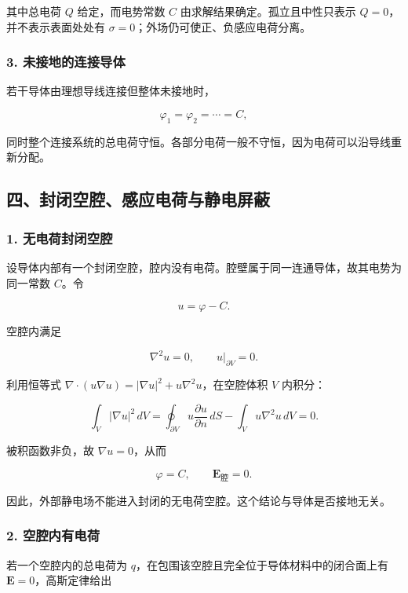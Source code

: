 其中总电荷 \(Q\) 给定，而电势常数 \(C\) 由求解结果确定。孤立且中性只表示
\(Q=0\)，并不表示表面处处有 \(\sigma=0\)；外场仍可使正、负感应电荷分离。

\subsubsection{3.
未接地的连接导体}\label{m2:ux672aux63a5ux5730ux7684ux8fdeux63a5ux5bfcux4f53}

若干导体由理想导线连接但整体未接地时，

\[
\varphi_1=\varphi_2=\cdots=C,
\]

同时整个连接系统的总电荷守恒。各部分电荷一般不守恒，因为电荷可以沿导线重新分配。

\subsection{四、封闭空腔、感应电荷与静电屏蔽}\label{m2:ux56dbux5c01ux95edux7a7aux8154ux611fux5e94ux7535ux8377ux4e0eux9759ux7535ux5c4fux853d}

\subsubsection{1.
无电荷封闭空腔}\label{m2:ux65e0ux7535ux8377ux5c01ux95edux7a7aux8154}

设导体内部有一个封闭空腔，腔内没有电荷。腔壁属于同一连通导体，故其电势为同一常数
\(C\)。令

\[
u=\varphi-C.
\]

空腔内满足

\[
\nabla^2u=0,
\qquad
u|_{\partial V}=0.
\]

利用恒等式
\(\nabla\cdot(u\nabla u)=|\nabla u|^2+u\nabla^2u\)，在空腔体积 \(V\)
内积分：

\[
\int_V|\nabla u|^2\,dV
=\oint_{\partial V}u\frac{\partial u}{\partial n}\,dS
-\int_Vu\nabla^2u\,dV=0.
\]

被积函数非负，故 \(\nabla u=0\)，从而

\[
\boxed{\varphi=C,\qquad \mathbf E_{\text{腔}}=0.}
\]

因此，外部静电场不能进入封闭的无电荷空腔。这个结论与导体是否接地无关。

\subsubsection{2.
空腔内有电荷}\label{m2:ux7a7aux8154ux5185ux6709ux7535ux8377}

若一个空腔内的总电荷为
\(q\)，在包围该空腔且完全位于导体材料中的闭合面上有
\(\mathbf E=0\)，高斯定律给出

